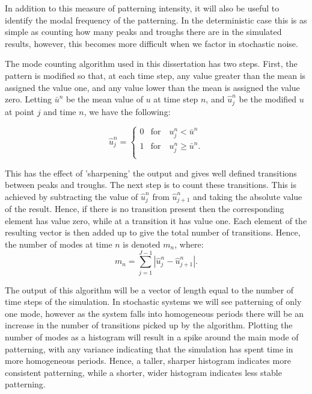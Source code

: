 \documentclass[12pt]{article}
\begin{document}
In addition to this measure of patterning intensity, it will also be useful to identify the modal frequency of the patterning. In the deterministic case this is as simple as counting how many peaks and troughs there are in the simulated results, however, this becomes more difficult when we factor in stochastic noise.

The mode counting algorithm used in this dissertation has two steps. First, the pattern is modified so that, at each time step, any value greater than the mean is assigned the value one, and any value lower than the mean is assigned the value zero. Letting $\bar{u}^n$ be the mean value of $u$ at time step $n$, and $\hat{u}_j^n$ be the modified $u$ at point $j$ and time $n$, we have the following:

\begin{equation}
 \hat{u}_j^n =  \left\{
\begin{array}{ll}
      0 & \text{for} \quad u_j^n<\bar{u}^n \\
      1 & \text{for} \quad u_j^n\geq\bar{u}^n. \\
\end{array} 
\right.
\end{equation}

This has the effect of 'sharpening' the output and gives well defined transitions between peaks and troughs. The next step is to count these transitions. This is achieved by subtracting the value of $\hat{u}_j^n$ from $\hat{u}_{j+1}^n$ and taking the absolute value of the result. Hence, if there is no transition present then the corresponding element has value zero, while at a transition it has value one. Each element of the resulting vector is then added up to give the total number of transitions. Hence, the number of modes at time $n$ is denoted $m_n$, where:
\begin{equation}\label{ModeAlg}
    m_n = \sum_{j=1}^{J-1} \left|\hat{u}_j^n - \hat{u}_{j+1}^n\right|.
\end{equation}

The output of this algorithm will be a vector of length equal to the number of time steps of the simulation. In stochastic systems we will see patterning of only one mode, however as the system falls into homogeneous periods there will be an increase in the number of transitions picked up by the algorithm. Plotting the number of modes as a histogram will result in a spike around the main mode of patterning, with any variance indicating that the simulation has spent time in more homogeneous periods. Hence, a taller, sharper histogram indicates more consistent patterning, while a shorter, wider histogram indicates less stable patterning. 
\end{document}
